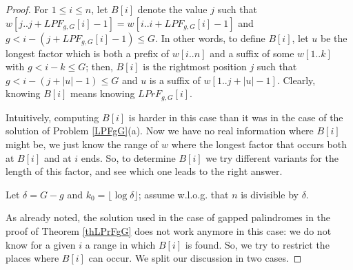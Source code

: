\documentclass[final]{dmtcs-episciences}
\newcommand{\LPF}{{\mathit{LPrF}}}
\newcommand{\LPdF}{{\mathit{LPF}}}
\begin{document}
\begin{proof}
For $1\leq i\leq n$, let $B[i]$ denote the value $j$ such that $w[j..j+\LPdF_{g,G}[i]-1]=w[i..i+\LPdF_{g,G}[i]-1]$ and $g<i-(j+\LPdF_{g,G}[i]-1)\leq G$. 
In other words, to define $B[i]$, let $u$ be the longest factor which is both a prefix of $w[i..n]$ and a suffix of some $w[1..k]$ with $g< i-k \leq G$; then, $B[i]$ is the rightmost position $j$ such that $g< i-(j+|u|-1)\leq G$ and $u$ is a suffix of $w[1..j+|u|-1]$. Clearly, knowing $B[i]$ means knowing $\LPF_{g,G}[i]$. 

Intuitively, computing $B[i]$ is harder in this case than it was in the case of the solution of Problem \ref{LPFgG}(a). Now we have no real information where $B[i]$ might be, we just know the range of $w$ where the longest factor that occurs both at $B[i]$ and at $i$ ends. So, to determine $B[i]$ we try different variants for the length of this factor, and see which one leads to the right answer. 

Let $\delta=G-g$ and $k_0=\lfloor \log \delta\rfloor$; assume w.l.o.g. that $n$ is divisible by $\delta$. 

As already noted, the solution used in the case of gapped palindromes in the proof of Theorem \ref{thLPrFgG} does not work anymore in this case: we do not know for a given $i$ a range in which $B[i]$ is found. So, we try to restrict the places where $B[i]$ can occur. We split our discussion in two cases.


\end{proof}
\end{document}
